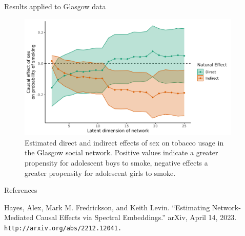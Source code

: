 \documentclass[final]{beamer}
\newlength{\sepwidth}
\newlength{\colwidth}
\newcommand{\separatorcolumn}{\begin{column}{\sepwidth}\end{column}}
\begin{document}
\begin{frame}[t]
\begin{columns}[t]
\begin{column}{\colwidth}
\begin{block}{Results applied to Glasgow data}
\begin{minipage}{.4\textwidth}
        \end{minipage}
        \begin{minipage}{.6\textwidth}

          \begin{figure}[ht!]
            \centering
            \includegraphics[width=\textwidth]{figures/glasgow/effects.png}
            \caption{Estimated direct and indirect effects of sex on tobacco usage in the Glasgow social network. Positive values indicate a greater propensity for adolescent boys to smoke, negative effects a greater propensity for adolescent girls to smoke.}
            \label{fig:glasgow-estimates}
          \end{figure}

        \end{minipage}

      \end{block}

      \begin{block}{References}

        Hayes, Alex, Mark M. Fredrickson, and Keith Levin. ``Estimating Network-Mediated Causal Effects via Spectral Embeddings.'' arXiv, April 14, 2023. \texttt{http://arxiv.org/abs/2212.12041.}

      \end{block}

    \end{column}

    \separatorcolumn
  \end{columns}
\end{frame}
\end{document}
